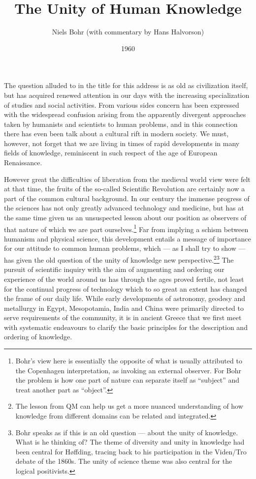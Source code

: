 \documentclass{tufte-handout}
\title{The Unity of Human Knowledge}
\author{Niels Bohr (with commentary by Hans Halvorson)}
\date{1960}
\begin{document}
\maketitle

The question alluded to in the title for this address is as old as
civilization itself, but has acquired renewed attention in our days
with the increasing specialization of studies and social
activities. From various sides concern has been expressed with the
widespread confusion arising from the apparently divergent approaches
taken by humanists and scientists to human problems, and in this
connection there has even been talk about a cultural rift in modern
society. We must, however, not forget that we are living in times of
rapid developments in many fields of knowledge, reminiscent in such
respect of the age of European Renaissance.

However great the difficulties of liberation from the medieval world
view were felt at that time, the fruits of the so-called Scientific
Revolution are certainly now a part of the common cultural
background. In our century the immense progress of the sciences has
not only greatly advanced technology and medicine, but has at the same
time given us an unsuspected lesson about our position as observers of
that nature of which we are part ourselves.\footnote{Bohr's view here is
  essentially the opposite of what is usually attributed to the
  Copenhagen interpretation, as invoking an external observer. For
  Bohr the problem is how one part of nature can separate itself as
  ``subject'' and treat another part as ``object''.} Far from implying
a schism between humanism and physical science, this development
entails a message of importance for our attitude to common human
problems, which --- as I shall try to show --- has given the old
question of the unity of knowledge new perspective.\footnote{The
  lesson from QM can help us get a more nuanced understanding of how
  knowledge from different domains can be related and
  integrated.}\footnote{Bohr speaks as if this is an old question ---
  about the unity of knowledge. What is he thinking of?  The theme of
  diversity and unity in knowledge had been central for Høffding,
  tracing back to his participation in the Viden/Tro debate of the
  1860s. The unity of science theme was also central for the logical
  positivists.} The pursuit of scientific inquiry with the aim of
augmenting and ordering our experience of the world around us has
through the ages proved fertile, not least for the continual progress
of technology which to so great an extent has changed the frame of our
daily life. While early developments of astronomy, geodesy and
metallurgy in Egypt, Mesopotamia, India and China were primarily
directed to serve requirements of the community, it is in ancient
Greece that we first meet with systematic endeavours to clarify the
basic principles for the description and ordering of knowledge.
\end{document}
